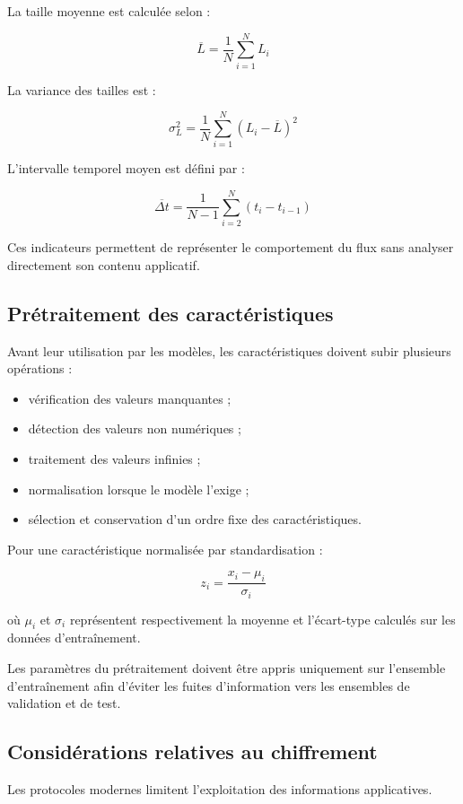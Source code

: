 La taille moyenne est calculée selon :

\[
\overline{L}=
\frac{1}{N}\sum_{i=1}^{N}L_i
\]

La variance des tailles est :

\[
\sigma_L^2=
\frac{1}{N}\sum_{i=1}^{N}
(L_i-\overline{L})^2
\]

L'intervalle temporel moyen est défini par :

\[
\overline{\Delta t}=
\frac{1}{N-1}
\sum_{i=2}^{N}(t_i-t_{i-1})
\]

Ces indicateurs permettent de représenter le comportement
du flux sans analyser directement son contenu applicatif.

\subsection{Prétraitement des caractéristiques}

Avant leur utilisation par les modèles, les caractéristiques
doivent subir plusieurs opérations :

\begin{itemize}
    \item vérification des valeurs manquantes ;
    \item détection des valeurs non numériques ;
    \item traitement des valeurs infinies ;
    \item normalisation lorsque le modèle l'exige ;
    \item sélection et conservation d'un ordre fixe
    des caractéristiques.
\end{itemize}

Pour une caractéristique normalisée par standardisation :

\[
z_i=\frac{x_i-\mu_i}{\sigma_i}
\]

où $\mu_i$ et $\sigma_i$ représentent respectivement
la moyenne et l'écart-type calculés sur les données
d'entraînement.

Les paramètres du prétraitement doivent être appris
uniquement sur l'ensemble d'entraînement afin d'éviter
les fuites d'information vers les ensembles de validation
et de test.

\subsection{Considérations relatives au chiffrement}

Les protocoles modernes limitent l'exploitation
des informations applicatives.

